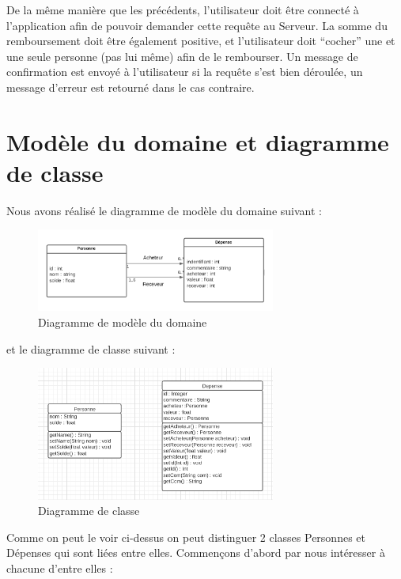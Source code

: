 \documentclass[12,french]{report}
\begin{document}
De la même manière que les précédents, l’utilisateur doit être connecté à l’application afin de pouvoir demander cette requête au Serveur. La somme du remboursement doit être également positive, et l’utilisateur doit “cocher” une et une seule personne (pas lui même) afin de le rembourser. Un message de confirmation est envoyé à l’utilisateur si la requête s’est bien déroulée, un message d’erreur est retourné dans le cas contraire.

\section{Modèle du domaine et diagramme de classe}

Nous avons réalisé le diagramme de modèle du domaine suivant :\\

\begin{figure}[H]
	\center
	\includegraphics[width=0.7\textwidth]{./Images/Modele}
	\caption{Diagramme de modèle du domaine}
\end{figure}\vspace{0.2cm}

et le diagramme de classe suivant :\\

\begin{figure}[H]
	\center
	\includegraphics[width=0.7\textwidth]{./Images/Classe}
	\caption{Diagramme de classe}
\end{figure}\vspace{0.2cm}


Comme on peut le voir ci-dessus on peut distinguer 2 classes Personnes et Dépenses qui sont liées entre elles. Commençons d’abord par nous intéresser à chacune d’entre elles :\\
\end{document}
